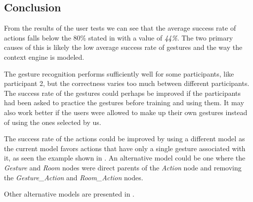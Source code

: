 \subsection{Conclusion}
\label{sec:evaluation:user-tests-conclusion}

From the results of the user tests we can see that the average success rate of actions falls below the 80\% stated in  with a value of \emph{44\%}.
The two primary causes of this is likely the low average success rate of gestures and the way the context engine is modeled.

The gesture recognition performs sufficiently well for some participants, like participant 2, but the correctness varies too much between different participants.
The success rate of the gestures could perhaps be improved if the participants had been asked to practice the gestures before training and using them.
It may also work better if the users were allowed to make up their own gestures instead of using the ones selected by us.

The success rate of the actions could be improved by using a different model as the current model favors actions that have only a single gesture associated with it, as seen the example shown in .
An alternative model could be one where the \emph{Gesture} and \emph{Room} nodes were direct parents of the \emph{Action} node and removing the \emph{Gesture\_Action} and \emph{Room\_Action} nodes.

Other alternative models are presented in .


